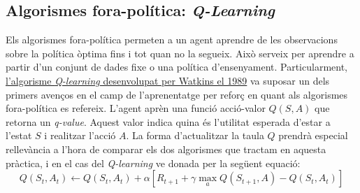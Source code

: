 \documentclass{article}
\begin{document}
\subsection{Algorismes fora-política: \textit{Q-Learning}}
Els algorismes fora-política permeten a un agent aprendre de les observacions sobre la política òptima fins i tot quan no la segueix. Això serveix per aprendre a partir d'un conjunt de dades fixe o una política d'ensenyament. Particularment, \href{https://link.springer.com/content/pdf/10.1007/BF00992698.pdf}{l'algorisme \textit{Q-learning} desenvolupat per Watkins el 1989} va suposar un dels primers avenços en el camp de l'aprenentatge per reforç en quant als algorismes fora-política es refereix. L'agent aprèn una funció acció-valor \(Q(S,A)\) que  retorna un \textit{q-value}. Aquest valor indica quina és l'utilitat esperada d'estar a l'estat \(S\) i realitzar l'acció \(A\). La forma d'actualitzar la taula \(Q\) prendrà especial rellevància a l'hora de comparar els dos algorismes que tractam en aquesta pràctica, i en el cas del \textit{Q-learning} ve donada per la següent equació:
\begin{equation}
    Q(S_t,A_t) \leftarrow Q(S_t,A_t) + \alpha[R_{t+1} + \gamma \max_{a} Q(S_{t+1},A) - Q(S_t,A_t)]
\label{equacio_q-learning}
\end{equation}
\end{document}
